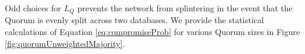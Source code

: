 \documentclass[USenglish,oneside,twocolumn]{article}
\begin{document}
Odd choices for $ L_{Q} $ prevents the network from splintering in the event that the Quorum is evenly split across two databases. We provide the statistical calculations of Equation \ref{eq:compromiseProb} for various Quorum sizes in Figure \ref{fig:quorumUnweightedMajority}.




%
%
%
%

\end{document}
